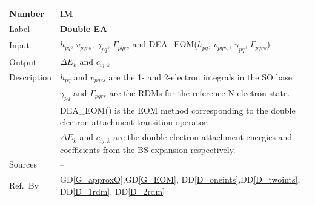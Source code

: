 \documentclass[12pt]{article}
\newcommand{\colAwidth}{0.13\textwidth}
\newcommand{\colBwidth}{0.82\textwidth}
\newcommand{\dref}[1]{GD\ref{#1}}
\newcommand{\ddref}[1]{DD\ref{#1}}
\newcounter{instnum} %
\begin{document}

\noindent
\begin{minipage}{\textwidth}
	\renewcommand*{\arraystretch}{1.5}
	\begin{tabular}{| p{\colAwidth} | p{\colBwidth}|}
		\hline
		\rowcolor[gray]{0.9}
		Number& IM{instnum}\theinstnum \label{IM_DEA}\\
		\hline
		Label& \bf Double EA\\
		\hline
		Input&$h_{pq}$, $v_{pqrs}$, $\gamma_{pq}$, $\Gamma_{pqrs}$ and 
		DEA\_EOM($h_{pq}$, $v_{pqrs}$, $\gamma_{pq}$, $\Gamma_{pqrs}$)\\
		\hline
		Output&$\Delta E_k$ and $c_{ij;k}$\\
		\hline
		Description& $h_{pq} $ and $ v_{pqrs}$ are the 1- and 2-electron 
		integrals in the SO base\\
		& $\gamma_{pq}$ and $\Gamma_{pqrs}$ are the RDMs for the reference 
		N-electron state.\\
		& DEA\_EOM() is the EOM method corresponding to the double electron 
		attachment transition operator.\\
		&$\Delta E_k$ and $c_{ij;k}$ are the double electron attachment 
		energies and coefficients from the BS expansion respectively.\\
		\hline
		Sources& -- \\
		\hline
		Ref.\ By & \dref{G_approxQ},\dref{G_EOM},  
		\ddref{D_oneints},\ddref{D_twoints}, \ddref{D_1rdm}, 
		\ddref{D_2rdm}\\
		\hline
	\end{tabular}
\end{minipage}\\

~\newline
\end{document}
